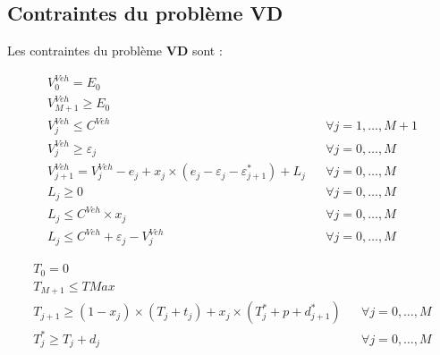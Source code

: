 \subsection{Contraintes du problème VD}
Les contraintes du problème \textbf{VD} sont :


\begin{subequations}
	\begin{align}
	\label{7}	V_{0}^{Veh}= E_0&  & \\
	\label{8}	V_{M+1}^{Veh}\geq E_{0}&  & \\
	\label{9}	V_{j}^{Veh}\leq C^{Veh}&  & \forall j= 1, \dots, M+1\\
	\label{10}	V_{j}^{Veh}\geq\varepsilon_{j}&  & \forall j= 0, \dots, M\\ 
	\label{11} V_{j+1}^{Veh}=V_{j}^{Veh}-e_j + x_j \times (e_j-\varepsilon_j-\varepsilon^*_{j+1}) +L_j&  & \forall j= 0, \dots, M \\
	\label{205} L_j \geq 0 &  & \forall j= 0, \dots, M \\
	\label{206} L_j \leq C^{Veh} \times x_j &  & \forall j= 0, \dots, M \\
	\label{207} L_j \leq C^{Veh} + \varepsilon_{j}-V_{j}^{Veh} &  & \forall j= 0, \dots, M 
	\end{align}
\end{subequations}

\begin{subequations}
	\label{Prod_temps_T}
	\begin{align}
	\label{13}	T_{0}= 0&  & \\ 
	\label{14}	T_{M+1}\leq TMax&  & \\
	\label{15}	T_{j+1}\geq (1-x_j)\times (T_j+t_j)+x_j\times (T^*_j+p+d^*_{j+1})&  & \forall j= 0, \dots, M\\
	\label{16}	T_{j}^*\geq T_j + d_j&  & \forall j= 0, \dots, M %
	\end{align}
\end{subequations}

